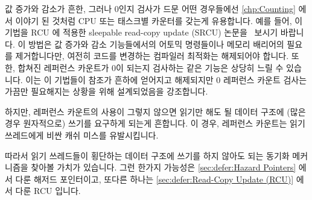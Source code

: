 값 증가와 감소가 흔한, 그러나 0인지 검사가 드문 어떤 경우들에선
\cref{chp:Counting} 에서 이야기 된 것처럼 CPU 또는 태스크별 카운터를 갖는게
유용합니다.
예를 들어, 이 기법을 RCU 에 적용한 sleepable read-copy update (SRCU)
논문을~\cite{PaulEMcKenney2006c} 보시기 바랍니다.
이 방법은 값 증가와 감소 기능들에서의 어토믹 명령들이나 메모리 배리어의 필요를
제거합니다만, 여전히 코드를 변경하는 컴파일러 최적화는 해제되어야 합니다.
또한, 합쳐진 레퍼런스 카운트가 0이 되는지 검사하는  같은
기능은 상당히 느릴 수 있습니다.
이는 이 기법들이 참조가 흔하에 얻어지고 해제되지만 0 레퍼런스 카운트 검사는
가끔만 필요해지는 상황을 위해 설계되었음을 강조합니다.

\iffalse

In some cases where increments and decrements are common, but checks
for zero are rare, it makes sense to maintain per-CPU or per-task
counters, as was discussed in \cref{chp:Counting}.
For example, see the paper on sleepable read-copy update (SRCU), which
applies this technique to RCU~\cite{PaulEMcKenney2006c}.
This approach eliminates the need for atomic instructions or memory
barriers on the increment and decrement primitives, but still requires
that code-motion compiler optimizations be disabled.
In addition, the primitives such as \co{synchronize_srcu()}
that check for the aggregate reference
count reaching zero can be quite slow.
This underscores the fact that these techniques are designed
for situations where the references are frequently acquired and
released, but where it is rarely necessary to check for a zero
reference count.

\fi


하지만, 레퍼런스 카운트의 사용이 그렇지 않으면 읽기만 해도 될 데이터 구조에
(많은 경우 원자적으로) 쓰기를 요구하게 되는게 흔합니다.
이 경우, 레퍼런스 카운트는 읽기 쓰레드에게 비싼 캐쉬 미스를 유발시킵니다.

따라서 읽기 쓰레드들이 횡단하는 데이터 구조에 쓰기를 하지 않아도 되는 동기화
메커니즘을 찾아볼 가치가 있습니다.
그런 한가지 가능성은
\cref{sec:defer:Hazard Pointers} 에서 다룬 해저드 포인터이고, 또다른 하나는
\cref{sec:defer:Read-Copy Update (RCU)} 에서 다룬 RCU 입니다.

\iffalse

However, it is usually the case that use of reference counts requires
writing (often atomically) to a data structure that is otherwise
read only.
In this case, reference counts are imposing expensive cache misses
on readers.

It is therefore worthwhile to look into synchronization mechanisms
that do not require readers to write to the data structure being
traversed.
One possibility is the hazard pointers covered in
\cref{sec:defer:Hazard Pointers}
and another is RCU, which is covered in
\cref{sec:defer:Read-Copy Update (RCU)}.

\fi
